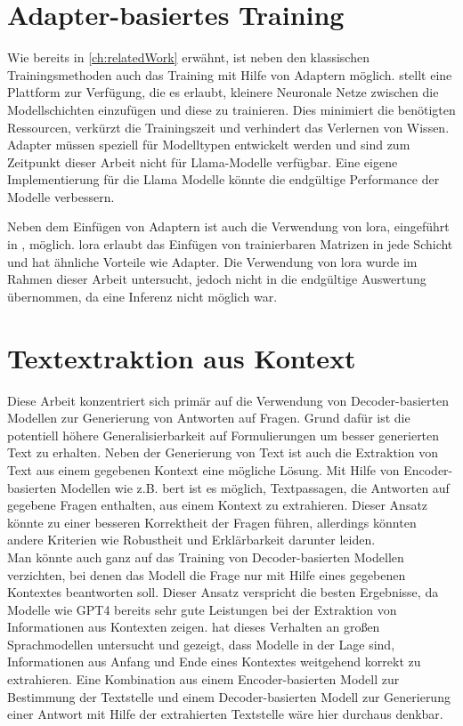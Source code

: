 \section{Adapter-basiertes Training}\label{sec:adapter-training}
Wie bereits in \cref{ch:relatedWork} erwähnt, ist neben den klassischen Trainingsmethoden auch das Training mit Hilfe von Adaptern möglich.
\citet{adapterhub} stellt eine Plattform zur Verfügung, die es erlaubt, kleinere Neuronale Netze zwischen die Modellschichten einzufügen und diese zu trainieren.
Dies minimiert die benötigten Ressourcen, verkürzt die Trainingszeit und verhindert das Verlernen von Wissen.
Adapter müssen speziell für Modelltypen entwickelt werden und sind zum Zeitpunkt dieser Arbeit nicht für Llama-Modelle verfügbar.
Eine eigene Implementierung für die Llama Modelle könnte die endgültige Performance der Modelle verbessern.

Neben dem Einfügen von Adaptern ist auch die Verwendung von \ac{lora}, eingeführt in \citet{lora}, möglich.
\ac{lora} erlaubt das Einfügen von trainierbaren Matrizen in jede Schicht und hat ähnliche Vorteile wie Adapter.
Die Verwendung von \ac{lora} wurde im Rahmen dieser Arbeit untersucht, jedoch nicht in die endgültige Auswertung übernommen, da eine Inferenz nicht möglich war.

\section{Textextraktion aus Kontext}
Diese Arbeit konzentriert sich primär auf die Verwendung von Decoder-basierten Modellen zur Generierung von Antworten auf Fragen.
Grund dafür ist die potentiell höhere Generalisierbarkeit auf Formulierungen um besser generierten Text zu erhalten.
Neben der Generierung von Text ist auch die Extraktion von Text aus einem gegebenen Kontext eine mögliche Lösung.
Mit Hilfe von Encoder-basierten Modellen wie z.B. \ac{bert} ist es möglich, Textpassagen, die Antworten auf gegebene Fragen enthalten, aus einem Kontext zu extrahieren.
Dieser Ansatz könnte zu einer besseren Korrektheit der Fragen führen, allerdings könnten andere Kriterien wie Robustheit und Erklärbarkeit darunter leiden.\\

Man könnte auch ganz auf das Training von Decoder-basierten Modellen verzichten, bei denen das Modell die Frage nur mit Hilfe eines gegebenen Kontextes beantworten soll.
Dieser Ansatz verspricht die besten Ergebnisse, da Modelle wie GPT4 bereits sehr gute Leistungen bei der Extraktion von Informationen aus Kontexten zeigen.
\citet{context-extract} hat dieses Verhalten an großen Sprachmodellen untersucht und gezeigt, dass Modelle in der Lage sind, Informationen aus Anfang und Ende eines Kontextes weitgehend korrekt zu extrahieren.
Eine Kombination aus einem Encoder-basierten Modell zur Bestimmung der Textstelle und einem Decoder-basierten Modell zur Generierung einer Antwort mit Hilfe der extrahierten Textstelle wäre hier durchaus denkbar.\\

